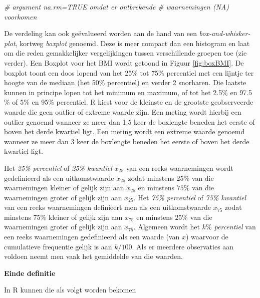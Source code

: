 \documentclass[12pt,dutch,coursenotes]{book}
\newenvironment{Shaded}{\begin{snugshade}}{\end{snugshade}}
\newcommand{\KeywordTok}[1]{\textcolor[rgb]{0.13,0.29,0.53}{\textbf{#1}}}
\newcommand{\DataTypeTok}[1]{\textcolor[rgb]{0.13,0.29,0.53}{#1}}
\newcommand{\FloatTok}[1]{\textcolor[rgb]{0.00,0.00,0.81}{#1}}
\newcommand{\CommentTok}[1]{\textcolor[rgb]{0.56,0.35,0.01}{\textit{#1}}}
\newcommand{\OtherTok}[1]{\textcolor[rgb]{0.56,0.35,0.01}{#1}}
\newcommand{\OperatorTok}[1]{\textcolor[rgb]{0.81,0.36,0.00}{\textbf{#1}}}
\newcommand{\NormalTok}[1]{#1}
\theoremstyle{definition}
\theoremstyle{definition}
\theoremstyle{definition}
\theoremstyle{remark}
\let\BeginKnitrBlock\begin \let\EndKnitrBlock\end
\begin{document}
\begin{Shaded}
\begin{Highlighting}[]
\CommentTok{# argument na.rm=TRUE omdat er ontbrekende}
\CommentTok{# waarnemingen (NA) voorkomen}
\end{Highlighting}
\end{Shaded}

De verdeling kan ook geëvalueerd worden aan de hand van een
\emph{box-and-whisker-plot}, kortweg \emph{boxplot} genoemd. Deze is
meer compact dan een histogram en laat om die reden gemakkelijker
vergelijkingen tussen verschillende groepen toe (zie verder). Een
Boxplot voor het BMI wordt getoond in Figuur \ref{fig:boxBMI}. De
boxplot toont een doos lopend van het 25\% tot 75\% percentiel met een
lijntje ter hoogte van de mediaan (het 50\% percentiel) en verder 2
snorharen. Die laatste kunnen in principe lopen tot het minimum en
maximum, of tot het 2.5\% en 97.5 \% of 5\% en 95\% percentiel. R kiest
voor de kleinste en de grootste geobserveerde waarde die geen outlier of
extreme waarde zijn. Een meting wordt hierbij een outlier genoemd
wanneer ze meer dan 1.5 keer de boxlengte beneden het eerste of boven
het derde kwartiel ligt. Een meting wordt een extreme waarde genoemd
wanneer ze meer dan 3 keer de boxlengte beneden het eerste of boven het
derde kwartiel ligt.

\BeginKnitrBlock{definition}[percentiel]
\protect\hypertarget{def:unnamed-chunk-35}{}{\label{def:unnamed-chunk-35}
\iffalse (percentiel) \fi{} }Het \emph{25\% percentiel} of \emph{25\%
kwantiel} \(x_{25}\) van een reeks waarnemingen wordt gedefinieerd als
een uitkomstwaarde \(x_{25}\) zodat minstens \(25\%\) van die
waarnemingen kleiner of gelijk zijn aan \(x_{25}\) en minstens \(75\%\)
van die waarnemingen groter of gelijk zijn aan \(x_{25}\). Het
\emph{75\% percentiel} of \emph{75\% kwantiel} van een reeks
waarnemingen definieert men als een uitkomstwaarde \(x_{75}\) zodat
minstens 75\% kleiner of gelijk zijn aan \(x_{75}\) en minstens \(25\%\)
van die waarnemingen groter of gelijk zijn aan \(x_{75}\). Algemeen
wordt het \emph{\(k\%\) percentiel} van een reeks waarnemingen
gedefinieerd als een waarde (van \(x\)) waarvoor de cumulatieve
frequentie gelijk is aan \(k/100.\) Als er meerdere observaties aan
voldoen neemt men vaak het gemiddelde van die waarden.

\textbf{Einde definitie}
\EndKnitrBlock{definition}

In R kunnen die als volgt worden bekomen

\begin{Shaded}
\end{Shaded}
\end{document}
